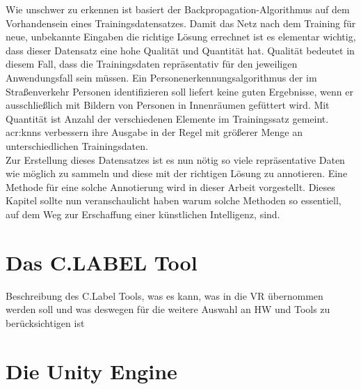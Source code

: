 Wie unschwer zu erkennen ist basiert der Backpropagation-Algorithmus auf dem Vorhandensein eines Trainingsdatensatzes. Damit das Netz nach dem Training für neue, unbekannte Eingaben die richtige Lösung errechnet ist es elementar wichtig, dass dieser Datensatz eine hohe Qualität und Quantität hat. Qualität bedeutet in diesem Fall, dass die Trainingsdaten repräsentativ für den jeweiligen Anwendungsfall sein müssen. Ein Personenerkennungsalgorithmus der im Straßenverkehr Personen identifizieren soll liefert keine guten Ergebnisse, wenn er ausschließlich mit Bildern von Personen in Innenräumen gefüttert wird. Mit Quantität ist Anzahl der verschiedenen Elemente im Trainingssatz gemeint. \acrshort{acr:knn}s verbessern ihre Ausgabe in der Regel mit größerer Menge an unterschiedlichen Trainingsdaten.\\

Zur Erstellung dieses Datensatzes ist es nun nötig so viele repräsentative Daten wie möglich zu sammeln und diese mit der richtigen Lösung zu annotieren. Eine Methode für eine solche Annotierung wird in dieser Arbeit vorgestellt. Dieses Kapitel sollte nun veranschaulicht haben warum  solche Methoden so essentiell, auf dem Weg zur Erschaffung einer künstlichen Intelligenz, sind.

\section{Das C.LABEL Tool}
\label{sec:C.LABEL}
Beschreibung des C.Label Tools, was es kann, was in die VR übernommen werden soll und was deswegen für die weitere Auswahl an HW und Tools zu berücksichtigen ist

\section{Die Unity Engine}
\label{sec:UnityEngine}

